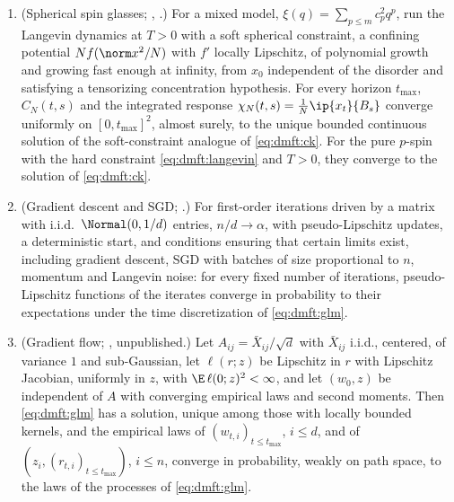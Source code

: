 \begin{refsection}
\begin{theorem}\label{thm:dmft:fixedhorizon}
\leavevmode
\begin{enumerate}
\item (Spherical spin glasses; \textcite[Theorem~1.2]{BenArousDemboGuionnet2006}, \textcite[Theorem~4.3]{Sellke2024}.) For a mixed model, $\xi(q)=\sum_{p\le m}c_p^2q^p$, run the Langevin dynamics at $T>0$ with a soft spherical constraint, a confining potential $Nf(\norm x^2/N)$ with $f'$ locally Lipschitz, of polynomial growth and growing fast enough at infinity, from $x_0$ independent of the disorder and satisfying a tensorizing concentration hypothesis. For every horizon $t_{\max}$, $C_N(t,s)$ and the integrated response $\chi_N(t,s)=\frac1N\ip{x_t}{B_s}$ converge uniformly on $[0,t_{\max}]^2$, almost surely, to the unique bounded continuous solution of the soft-constraint analogue of \eqref{eq:dmft:ck}. For the pure $p$-spin with the hard constraint \eqref{eq:dmft:langevin} and $T>0$, they converge to the solution of \eqref{eq:dmft:ck}.
\item (Gradient descent and SGD; \textcite[Theorem~3.2]{GerbelotEtAl2024}.) For first-order iterations driven by a matrix with i.i.d.\ $\Normal(0,1/d)$ entries, $n/d\to\alpha$, with pseudo-Lipschitz updates, a deterministic start, and conditions ensuring that certain limits exist, including gradient descent, SGD with batches of size proportional to $n$, momentum and Langevin noise: for every fixed number of iterations, pseudo-Lipschitz functions of the iterates converge in probability to their expectations under the time discretization of \eqref{eq:dmft:glm}.
\item (Gradient flow; \textcite[Theorem~2, Corollary~4.1]{CelentanoChengMontanari2021}, unpublished.) Let $A_{ij}=\bar X_{ij}/\sqrt d$ with $\bar X_{ij}$ i.i.d., centered, of variance $1$ and sub-Gaussian, let $\ell(r;z)$ be Lipschitz in $r$ with Lipschitz Jacobian, uniformly in $z$, with $\E\,\ell(0;z)^2<\infty$, and let $(w_0,z)$ be independent of $A$ with converging empirical laws and second moments. Then \eqref{eq:dmft:glm} has a solution, unique among those with locally bounded kernels, and the empirical laws of $(w_{t,i})_{t\le t_{\max}}$, $i\le d$, and of $(z_i,(r_{t,i})_{t\le t_{\max}})$, $i\le n$, converge in probability, weakly on path space, to the laws of the processes of \eqref{eq:dmft:glm}.
\end{enumerate}
\end{theorem}


\end{refsection}
